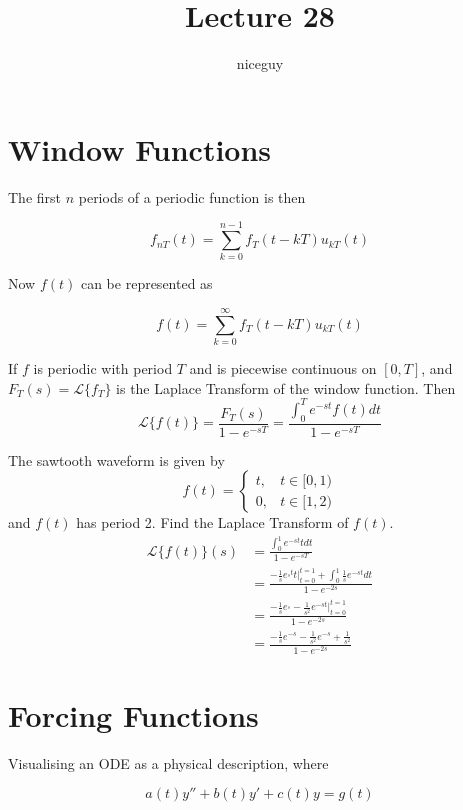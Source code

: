 \documentclass[12pt]{article}
\author{niceguy}
\title{Lecture 28}
\begin{document}
\maketitle

\section{Window Functions}

The first $n$ periods of a periodic function is then

$$f_{nT}(t) = \sum_{k=0}^{n-1} f_T(t-kT)u_{kT}(t)$$

Now $f(t)$ can be represented as

$$f(t) = \sum_{k=0}^\infty f_T(t-kT)u_{kT}(t)$$

\begin{thm}
	If $f$ is periodic with period $T$ and is piecewise continuous on $[0,T]$, and $F_T(s) = \mathcal{L}\{f_T\}$ is the Laplace Transform of the window function. Then
	$$\mathcal{L}\{f(t)\} = \frac{F_T(s)}{1-e^{-sT}} = \frac{\int_0^Te^{-st}f(t)dt}{1-e^{-sT}}$$
\end{thm}

\begin{ex}
	The sawtooth waveform is given by
	$$f(t) = \begin{cases} t, & t \in [0,1) \\ 0, & t \in [1,2)\end{cases}$$
	and $f(t)$ has period 2. Find the Laplace Transform of $f(t)$.
	\begin{align*}
		\mathcal{L}\{f(t)\}(s) &= \frac{\int_0^1e^{-st}tdt}{1-e^{-sT}} \\
				       &= \frac{-\frac{1}{s}e^{_st}t \Big |_{t=0}^{t=1} + \int_0^1 \frac{1}{s}e^{-st}dt}{1-e^{-2s}} \\
				       &= \frac{-\frac{1}{s}e^{_s}-\frac{1}{s^2}e^{-st} \Big |_{t=0}^{t=1}}{1-e^{-2s}} \\
				       &= \frac{-\frac{1}{s}e^{-s}-\frac{1}{s^2}e^{-s}+\frac{1}{s^2}}{1-e^{-2s}}
	\end{align*}
\end{ex}

\section{Forcing Functions}

Visualising an ODE as a physical description, where

$$a(t)y'' + b(t)y' + c(t)y = g(t)$$
\end{document}
